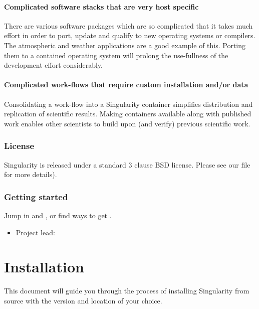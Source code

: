 \documentclass[letterpaper,10pt,english]{sphinxmanual}
\begin{document}
\subsubsection{Complicated software stacks that are very host specific}
\label{\detokenize{introduction:complicated-software-stacks-that-are-very-host-specific}}
There are various software packages which are so complicated that it takes much effort in order to port, update and qualify to new operating systems or compilers. The atmospheric and weather applications are a good example of this. Porting them to a contained operating system will prolong the use-fullness of the development effort considerably.


\subsubsection{Complicated work-flows that require custom installation and/or data}
\label{\detokenize{introduction:complicated-work-flows-that-require-custom-installation-and-or-data}}
Consolidating a work-flow into a Singularity container simplifies distribution and replication of scientific results. Making containers available along with published work enables other scientists to build upon (and verify) previous scientific work.


\subsection{License}
\label{\detokenize{introduction:license}}
Singularity is released under a standard 3 clause BSD license.
Please see our  file for more details).


\subsection{Getting started}
\label{\detokenize{introduction:getting-started}}
Jump in and {\hyperref[\detokenize{quick_start:quick-start}]{}}, or find ways to get .
\begin{itemize}
\item {} 
Project lead: 

\end{itemize}


\chapter{Installation}
\label{\detokenize{installation:installation}}\label{\detokenize{installation:id1}}\label{\detokenize{installation::doc}}\label{\detokenize{installation:sec-installation}}
This document will guide you through the process of installing
Singularity from source with the version and location of your choice.
\end{document}
